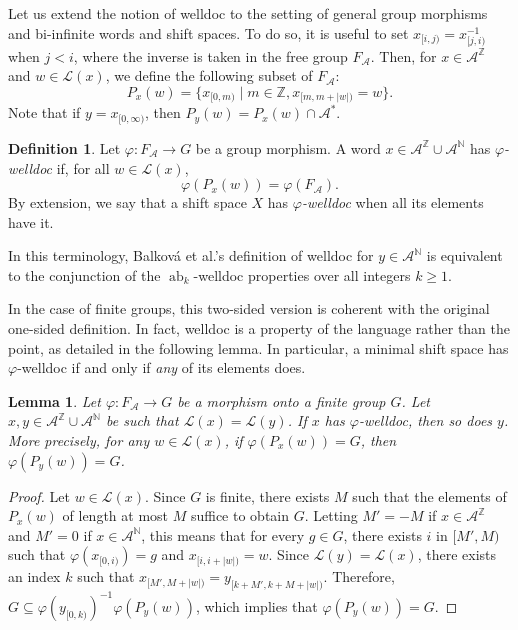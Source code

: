 \documentclass{amsart}
\newcommand*{\N}{\mathbb{N}}
\newcommand*{\nn}{\mathbb{N}}
\newcommand*{\zz}{\mathbb{Z}}
\newcommand*{\Z}{\mathbb{Z}}
\newcommand*{\lang}{\mathcal{L}}
\newcommand*{\cA}{\mathcal{A}}
\newcommand*{\from}{\colon}
\newcommand*{\ab}{\operatorname{ab}}
\theoremstyle{plain}
\newtheorem{lemma}[theorem]{Lemma}
\theoremstyle{definition}
\newtheorem{definition}[theorem]{Definition}
\theoremstyle{remark}
\begin{document}
Let us extend the notion of welldoc to the setting of general group morphisms and bi-infinite words and shift spaces. To do so, it is useful to set $x_{[i,j)} = x_{[j,i)}^{-1}$ when $j<i$, where the inverse is taken in the free group $F_\cA$. Then, for $x\in \cA^\Z$ and $w\in\lang(x)$, we define the following subset of $F_\cA$:
\begin{equation*}
    P_x(w) = \{ x_{[0,m)} \mid m \in \zz, x_{[m,m+|w|)} = w\}.
\end{equation*}
Note that if $y = x_{[0,\infty)}$, then $P_y(w) = P_x(w)\cap \cA^*$.

\begin{definition}
    Let $\varphi\from F_\cA\to G$ be a group morphism. A word $x\in\cA^\zz \cup \cA^\N$ has \emph{$\varphi$-welldoc} if, for all $w\in\lang(x)$,
    \begin{equation*}
        \varphi(P_x(w)) = \varphi(F_\cA).
    \end{equation*}
    By extension, we say that a shift space $X$ has \emph{$\varphi$-welldoc} when all its elements have it.
\end{definition}

In this terminology, Balková et al.'s definition of welldoc for $y \in \cA^\N$ is equivalent to the conjunction of the $\ab_k$-welldoc properties over all integers $k\geq 1$. 

In the case of finite groups, this two-sided version is coherent with the original one-sided definition. In fact, welldoc is a property of the language rather than the point, as detailed in the following lemma.
In particular, a minimal shift space has $\varphi$-welldoc if and only if \emph{any} of its elements does.


\begin{lemma}\label{L:welldoc one and two sided}
    Let $\varphi\from F_\cA \to G$ be a morphism onto a finite group $G$. Let $x,y\in\cA^\zz\cup\cA^\nn$ be such that $\lang(x)=\lang(y)$. If $x$ has $\varphi$-welldoc, then so does $y$.
    More precisely, for any $w \in \lang(x)$, if $\varphi(P_x(w)) = G$, then $\varphi(P_y(w)) = G$.
\end{lemma}

\begin{proof}
    Let $w \in \lang(x)$. Since $G$ is finite, there exists $M$ such that the elements of $P_x(w)$ of length at most $M$ suffice to obtain $G$. Letting $M'=-M$ if $x\in\cA^\zz$ and $M'=0$ if $x\in\cA^\nn$, this means that for every $g\in G$, there exists $i$ in $[M',M)$ such that $\varphi(x_{[0,i)})=g$ and $x_{[i,i+|w|)}=w$. Since $\lang(y) = \lang(x)$, there exists an index $k$ such that $x_{[M',M+|w|)} = y_{[k+M',k+M+|w|)}$. Therefore, $G \subseteq \varphi(y_{[0,k)})^{-1} \varphi(P_y(w))$, which implies that $\varphi(P_y(w)) = G$.
\end{proof}
\end{document}
